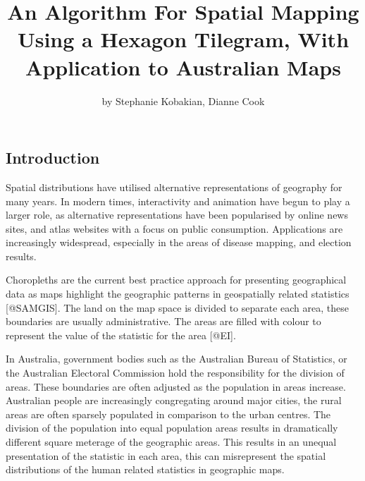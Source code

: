 \title{An Algorithm For Spatial Mapping Using a Hexagon Tilegram, With
Application to Australian Maps}
\author{by Stephanie Kobakian, Dianne Cook}

\maketitle



\hypertarget{introduction}{%
\subsection{Introduction}\label{introduction}}

Spatial distributions have utilised alternative representations of
geography for many years. In modern times, interactivity and animation
have begun to play a larger role, as alternative representations have
been popularised by online news sites, and atlas websites with a focus
on public consumption. Applications are increasingly widespread,
especially in the areas of disease mapping, and election results.

Choropleths are the current best practice approach for presenting
geographical data as maps highlight the geographic patterns in
geospatially related statistics {[}@SAMGIS{]}. The land on the map space
is divided to separate each area, these boundaries are usually
administrative. The areas are filled with colour to represent the value
of the statistic for the area {[}@EI{]}.

In Australia, government bodies such as the Australian Bureau of
Statistics, or the Australian Electoral Commission hold the
responsibility for the division of areas. These boundaries are often
adjusted as the population in areas increase. Australian people are
increasingly congregating around major cities, the rural areas are often
sparsely populated in comparison to the urban centres. The division of
the population into equal population areas results in dramatically
different square meterage of the geographic areas. This results in an
unequal presentation of the statistic in each area, this can
misrepresent the spatial distributions of the human related statistics
in geographic maps.

